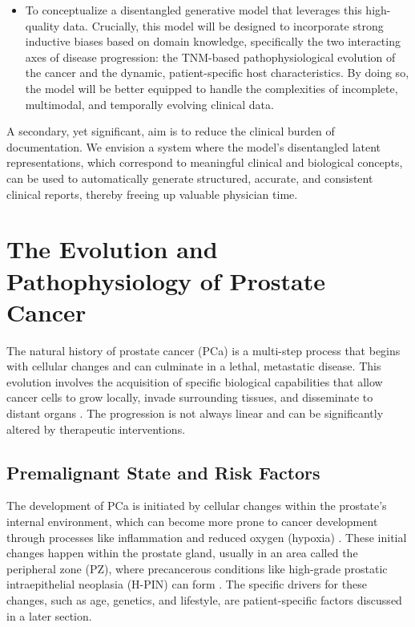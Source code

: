\documentclass[11pt, a4paper]{article}
\begin{document}
\begin{itemize}
    
    \item To conceptualize a disentangled generative model that leverages this high-quality data. Crucially, this model will be designed to incorporate strong inductive biases based on domain knowledge, specifically the two interacting axes of disease progression: the TNM-based pathophysiological evolution of the cancer and the dynamic, patient-specific host characteristics. By doing so, the model will be better equipped to handle the complexities of incomplete, multimodal, and temporally evolving clinical data.
\end{itemize}
A secondary, yet significant, aim is to reduce the clinical burden of documentation. We envision a system where the model's disentangled latent representations, which correspond to meaningful clinical and biological concepts, can be used to automatically generate structured, accurate, and consistent clinical reports, thereby freeing up valuable physician time.



\section{The Evolution and Pathophysiology of Prostate Cancer}
The natural history of prostate cancer (PCa) is a multi-step process that begins with cellular changes and can culminate in a lethal, metastatic disease. This evolution involves the acquisition of specific biological capabilities that allow cancer cells to grow locally, invade surrounding tissues, and disseminate to distant organs \cite{OrzechowskaAnusewicz2022}. The progression is not always linear and can be significantly altered by therapeutic interventions.

\subsection{Premalignant State and Risk Factors}
The development of PCa is initiated by cellular changes within the prostate's internal environment, which can become more prone to cancer development through processes like inflammation and reduced oxygen (hypoxia) \cite{BianchiFriasDamodarasamy2019, MartinCaraballo2024}. These initial changes happen within the prostate gland, usually in an area called the peripheral zone (PZ), where precancerous conditions like high-grade prostatic intraepithelial neoplasia (H-PIN) can form \cite{UnknownAuthor2017}. The specific drivers for these changes, such as age, genetics, and lifestyle, are patient-specific factors discussed in a later section.
\end{document}

